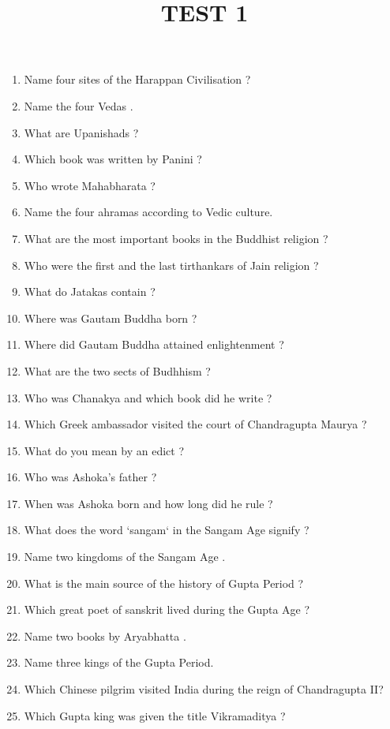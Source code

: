 \documentclass[12pt , a4paper]{article}
\title{TEST 1 }
\date{}
\begin{document}
 
\maketitle
\begin{enumerate}

\item Name four sites of the Harappan Civilisation ? 
\item Name the four Vedas . 
\item What are Upanishads ? 
\item Which book was written by Panini ? 
\item Who wrote Mahabharata ? 
\item Name the four ahramas according to Vedic culture. 
\item What are the most important books in the Buddhist religion ? 
\item Who were the first and the last tirthankars of Jain religion ? 
\item What do Jatakas contain ? 
\item Where was Gautam Buddha born ? 
\item Where did Gautam Buddha attained enlightenment ? 
\item What are the two sects of Budhhism ? 
\item Who was Chanakya and which book did he write ?
\item Which Greek ambassador visited the court of Chandragupta Maurya ? 
\item What do you mean by an edict ? 
\item Who was Ashoka's father ? 
\item When was Ashoka born and how long did he rule ? 
\item What does the word `sangam` in the Sangam Age signify ? 
\item Name two kingdoms of the Sangam Age .
\item What is the main source of the history of Gupta Period ? 
\item Which great poet of sanskrit lived during the Gupta Age ? 
\item Name two books by Aryabhatta . 
\item Name three kings of the Gupta Period. 
\item Which Chinese pilgrim visited India during the reign of Chandragupta II? 
\item Which Gupta king was given the title Vikramaditya ? 


\end {enumerate} 
\end{document}
